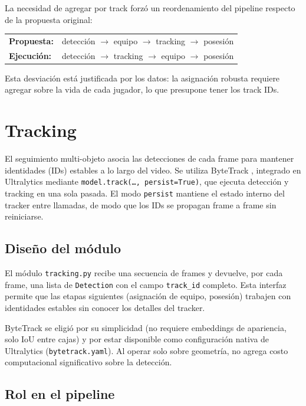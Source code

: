 \documentclass[conference]{IEEEtran}
\begin{document}
La necesidad de agregar por track forzó un reordenamiento del pipeline
respecto de la propuesta original:

\begin{center}
\small
\begin{tabular}{ll}
\textbf{Propuesta:} & detección $\to$ equipo $\to$ tracking $\to$ posesión \\
\textbf{Ejecución:} & detección $\to$ tracking $\to$ equipo $\to$ posesión \\
\end{tabular}
\end{center}

Esta desviación está justificada por los datos: la asignación robusta
requiere agregar sobre la vida de cada jugador, lo que presupone tener los
track IDs.

\section{Tracking}
\label{sec:tracking}

El seguimiento multi-objeto asocia las detecciones de cada frame para
mantener identidades (IDs) estables a lo largo del video. Se utiliza
ByteTrack \cite{b_bytetrack}, integrado en Ultralytics mediante
\texttt{model.track(\ldots, persist=True)}, que ejecuta detección y
tracking en una sola pasada. El modo \texttt{persist} mantiene el estado
interno del tracker entre llamadas, de modo que los IDs se propagan
frame a frame sin reiniciarse.

\subsection{Diseño del módulo}

El módulo \texttt{tracking.py} recibe una secuencia de frames y devuelve,
por cada frame, una lista de \texttt{Detection} con el campo
\texttt{track\_id} completo. Esta interfaz permite que las etapas
siguientes (asignación de equipo, posesión) trabajen con identidades
estables sin conocer los detalles del tracker.

ByteTrack se eligió por su simplicidad (no requiere embeddings de
apariencia, solo IoU entre cajas) y por estar disponible como
configuración nativa de Ultralytics (\texttt{bytetrack.yaml}). Al operar
solo sobre geometría, no agrega costo computacional significativo sobre la
detección.

\subsection{Rol en el pipeline}
\end{document}

